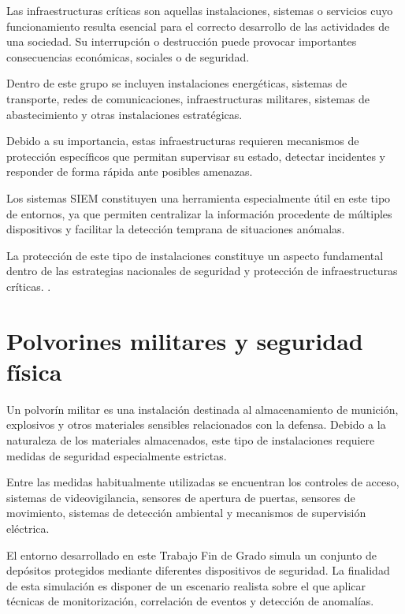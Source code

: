 Las infraestructuras críticas son aquellas instalaciones, sistemas o servicios cuyo funcionamiento resulta esencial para el correcto desarrollo de las actividades de una sociedad. Su interrupción o destrucción puede provocar importantes consecuencias económicas, sociales o de seguridad.

Dentro de este grupo se incluyen instalaciones energéticas, sistemas de transporte, redes de comunicaciones, infraestructuras militares, sistemas de abastecimiento y otras instalaciones estratégicas.

Debido a su importancia, estas infraestructuras requieren mecanismos de protección específicos que permitan supervisar su estado, detectar incidentes y responder de forma rápida ante posibles amenazas.

Los sistemas SIEM constituyen una herramienta especialmente útil en este tipo de entornos, ya que permiten centralizar la información procedente de múltiples dispositivos y facilitar la detección temprana de situaciones anómalas.

La protección de este tipo de instalaciones constituye un aspecto fundamental dentro de las estrategias nacionales de seguridad y protección de infraestructuras críticas. \cite{ley811}.

\section{Polvorines militares y seguridad física}

Un polvorín militar es una instalación destinada al almacenamiento de munición, explosivos y otros materiales sensibles relacionados con la defensa. Debido a la naturaleza de los materiales almacenados, este tipo de instalaciones requiere medidas de seguridad especialmente estrictas.

Entre las medidas habitualmente utilizadas se encuentran los controles de acceso, sistemas de videovigilancia, sensores de apertura de puertas, sensores de movimiento, sistemas de detección ambiental y mecanismos de supervisión eléctrica. 


El entorno desarrollado en este Trabajo Fin de Grado simula un conjunto de depósitos protegidos mediante diferentes dispositivos de seguridad. La finalidad de esta simulación es disponer de un escenario realista sobre el que aplicar técnicas de monitorización, correlación de eventos y detección de anomalías.


